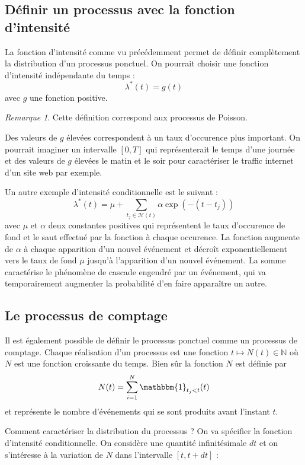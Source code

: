 \documentclass{article}
\theoremstyle{definition}
\theoremstyle{remark}
\newtheorem*{rem}{Remarque}
\begin{document}
\subsection{Définir un processus avec la fonction d'intensité}

La fonction d'intensité comme vu précédemment permet de définir complètement
la distribution d'un processus ponctuel. On pourrait choisir une
fonction d'intensité indépendante du temps :
$$\lambda^*(t) = g(t)$$ avec $g$ une fonction positive.
\begin{rem}
Cette définition correspond aux processus de Poisson.
\end{rem}

Des valeurs de $g$ élevées correspondent à un taux d'occurence plus
important. On pourrait imaginer un intervalle $[0, T]$ qui représenterait
le temps d'une journée et des valeurs de $g$ élevées le matin et le soir
pour caractériser le traffic internet d'un site web par exemple.

Un autre exemple d'intensité conditionnelle est le suivant :
$$\lambda^*(t) = \mu + \sum_{t_j \in \mathcal{H}(t)}\alpha \exp(-(t - t_j))$$
avec $\mu$ et $\alpha$ deux constantes positives qui représentent
le taux d'occurence de fond et le saut effectué par la fonction à chaque
occurence. La fonction augmente de $\alpha$ à chaque apparition d'un nouvel
événement et décroît exponentiellement vers le taux de fond $\mu$
jusqu'à l'apparition d'un nouvel événement. La somme caractérise le phénomène
de cascade engendré par un événement, qui va temporairement augmenter
la probabilité d'en faire apparaître un autre.

\subsection{Le processus de comptage}

Il est également possible de définir le processus ponctuel comme un processus
de comptage. Chaque réalisation d'un processus est une fonction
$t \mapsto N(t) \in \mathbb{N}$ où $N$ est une fonction croissante du temps.
Bien sûr la fonction $N$ est définie par
$$N(t) = \sum_{i=1}^N \mathbbm{1}_{t_j < t}(t)$$
et représente le nombre d'événements qui se sont produits avant
l'instant $t$.

Comment caractériser la distribution du processus ? On va spécifier
la fonction d'intensité conditionnelle. On considère une quantité
infinitésimale $dt$ et on s'intéresse à la variation de $N$ dans l'intervalle
$[t, t + dt]$ :
\end{document}
